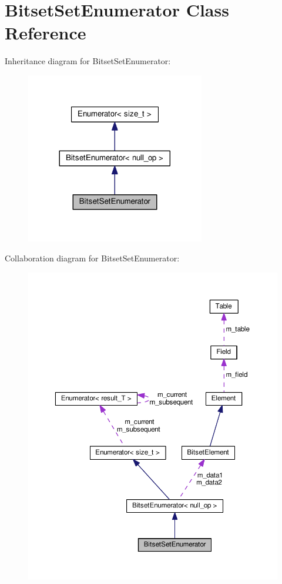 \hypertarget{classBitsetSetEnumerator}{}\section{Bitset\+Set\+Enumerator Class Reference}
\label{classBitsetSetEnumerator}


Inheritance diagram for Bitset\+Set\+Enumerator\+:\nopagebreak
\begin{figure}[H]
\begin{center}
\leavevmode
\includegraphics[width=221pt]{classBitsetSetEnumerator__inherit__graph}
\end{center}
\end{figure}


Collaboration diagram for Bitset\+Set\+Enumerator\+:\nopagebreak
\begin{figure}[H]
\begin{center}
\leavevmode
\includegraphics[width=350pt]{classBitsetSetEnumerator__coll__graph}
\end{center}
\end{figure}
